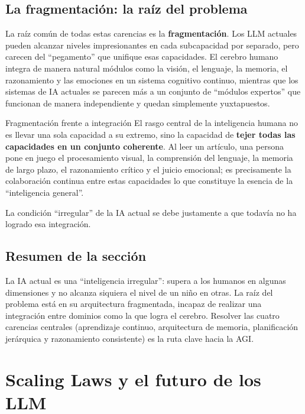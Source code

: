 \documentclass[a4paper]{article}
\begin{document}
\subsection{La fragmentación: la raíz del problema}

La raíz común de todas estas carencias es la \textbf{fragmentación}. Los LLM actuales pueden alcanzar niveles impresionantes en cada subcapacidad por separado, pero carecen del ``pegamento'' que unifique esas capacidades. El cerebro humano integra de manera natural módulos como la visión, el lenguaje, la memoria, el razonamiento y las emociones en un sistema cognitivo continuo, mientras que los sistemas de IA actuales se parecen más a un conjunto de ``módulos expertos'' que funcionan de manera independiente y quedan simplemente yuxtapuestos.

\begin{importantbox}{Fragmentación frente a integración}
El rasgo central de la inteligencia humana no es llevar una sola capacidad a su extremo, sino la capacidad de \textbf{tejer todas las capacidades en un conjunto coherente}. Al leer un artículo, una persona pone en juego el procesamiento visual, la comprensión del lenguaje, la memoria de largo plazo, el razonamiento crítico y el juicio emocional; es precisamente la colaboración continua entre estas capacidades lo que constituye la esencia de la ``inteligencia general''.

La condición ``irregular'' de la IA actual se debe justamente a que todavía no ha logrado esa integración.
\end{importantbox}

\subsection{Resumen de la sección}

La IA actual es una ``inteligencia irregular'': supera a los humanos en algunas dimensiones y no alcanza siquiera el nivel de un niño en otras. La raíz del problema está en su arquitectura fragmentada, incapaz de realizar una integración entre dominios como la que logra el cerebro. Resolver las cuatro carencias centrales (aprendizaje continuo, arquitectura de memoria, planificación jerárquica y razonamiento consistente) es la ruta clave hacia la AGI.

\section{Scaling Laws y el futuro de los LLM}
\end{document}
